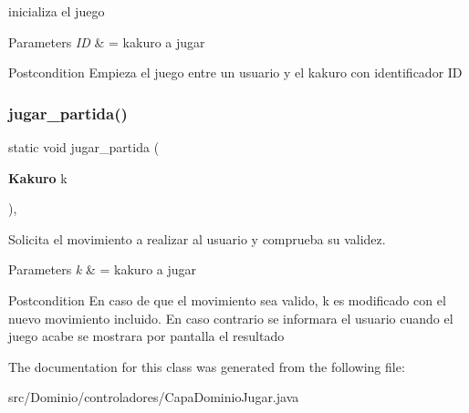 inicializa el juego 


\begin{DoxyParams}{Parameters}
{\em ID} & = kakuro a jugar \\
\hline
\end{DoxyParams}
\begin{DoxyPostcond}{Postcondition}
Empieza el juego entre un usuario y el kakuro con identificador ID 
\end{DoxyPostcond}
\mbox{\label{class_dominio_1_1controladores_1_1_capa_dominio_jugar_a7aeb1cb8a5b4d9f59ce79522d8f803ae}} 
\subsubsection{jugar\+\_\+partida()}
{\footnotesize\ttfamily static void jugar\+\_\+partida (\begin{DoxyParamCaption}\item[{\textbf{ Kakuro}}]{k }\end{DoxyParamCaption})\hspace{0.3cm}{\ttfamily [inline]}, {\ttfamily [static]}}



Solicita el movimiento a realizar al usuario y comprueba su validez. 


\begin{DoxyParams}{Parameters}
{\em k} & = kakuro a jugar \\
\hline
\end{DoxyParams}
\begin{DoxyPostcond}{Postcondition}
En caso de que el movimiento sea valido, k es modificado con el nuevo movimiento incluido. En caso contrario se informara el usuario cuando el juego acabe se mostrara por pantalla el resultado 
\end{DoxyPostcond}


The documentation for this class was generated from the following file\+:\begin{DoxyCompactItemize}
\item 
src/\+Dominio/controladores/Capa\+Dominio\+Jugar.\+java\end{DoxyCompactItemize}
